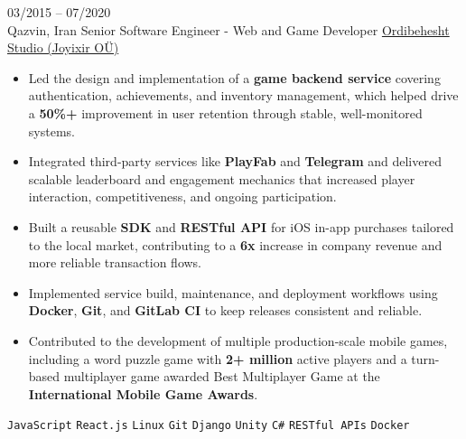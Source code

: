 \entry
{03/2015 -- 07/2020 \\ Qazvin, Iran}
{Senior Software Engineer - Web and Game Developer}
{\href{https://www.joyixir.com/}{Ordibehesht Studio  (Joyixir OÜ)}}
{\vspace{-10pt}
    \begin{itemize}[noitemsep,topsep=0pt,parsep=0pt,partopsep=0pt, leftmargin=-1pt]
        \item Led the design and implementation of a \textbf{game backend service} covering authentication, achievements, and inventory management, which helped drive a \textbf{50\%+} improvement in user retention through stable, well-monitored systems.
        \item Integrated third-party services like \textbf{PlayFab} and \textbf{Telegram} and delivered scalable leaderboard and engagement mechanics that increased player interaction, competitiveness, and ongoing participation.
        \item Built a reusable \textbf{SDK} and \textbf{RESTful API} for iOS in-app purchases tailored to the local market, contributing to a \textbf{6x} increase in company revenue and more reliable transaction flows.
        \item Implemented service build, maintenance, and deployment workflows using \textbf{Docker}, \textbf{Git}, and \textbf{GitLab CI} to keep releases consistent and reliable.
        \item Contributed to the development of multiple production-scale mobile games, including a word puzzle game with \textbf{2+ million} active players and a turn-based multiplayer game awarded Best Multiplayer Game at the \textbf{International Mobile Game Awards}.
    \end{itemize}
    \texttt{JavaScript} \slashsep \texttt{React.js} \slashsep \texttt{Linux} \slashsep \texttt{Git} \slashsep \texttt{Django} \slashsep \texttt{Unity} \slashsep \texttt{C\#} \slashsep \texttt{RESTful APIs} \slashsep \texttt{Docker}
}
